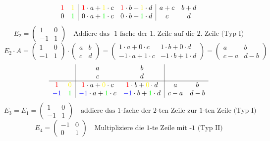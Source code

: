 \documentclass[9pt]{article} %
\begin{document}
\begin{bsp}
{\[\begin{array}{cc|cc|cc}
  \textcolor{red}{1} & \textcolor{yellow}{1} &  \textcolor{red}{1} \cdot a + \textcolor{yellow}{1}  \cdot c & \textcolor{red}{1} \cdot b + \textcolor{yellow}{1} \cdot d  & a+c & b+d \\
  0 & \textcolor{green}{1} & 0 \cdot a + \textcolor{green}{1}  \cdot c & 0 \cdot b + \textcolor{green}{1} \cdot d  & c & d 
\end{array}
\]
\hrulefill
\[
E_2 = \begin{pmatrix}
        1 & 0\\
        -1 & 1
\end{pmatrix} \quad \text{Addiere das -1-fache der 1. Zeile auf die 2. Zeile (Typ I)}
\]
\[
E_2 \cdot A = \begin{pmatrix} 
1 & 0\\
-1 & 1
\end{pmatrix} 
\cdot 
\begin{pmatrix} 
a & b \\
c & d 
\end{pmatrix} 
=
\begin{pmatrix} 
1 \cdot a + 0 \cdot c & 1 \cdot b + 0 \cdot d \\
-1 \cdot a + 1 \cdot c & -1 \cdot b + 1 \cdot d 
\end{pmatrix}
=
\begin{pmatrix} 
a  & b \\
c-a & d-b
\end{pmatrix}
\]
\[
\begin{array}{cc|cc|cc}
  &  & a&b  \\ 
  & &  c & d   \\ \hline
  \textcolor{red}{1} & \textcolor{yellow}{0} &  \textcolor{red}{1} \cdot a + \textcolor{yellow}{0}  \cdot c & \textcolor{red}{1} \cdot b + \textcolor{yellow}{0} \cdot d  & a & b \\
  \textcolor{blue}{-1} & \textcolor{green}{1} &  \textcolor{blue}{-1} \cdot a + \textcolor{green}{1}  \cdot c &  \textcolor{blue}{-1} \cdot b + \textcolor{green}{1} \cdot d  & c-a & d-b
\end{array}
\]
\hrulefill
\[
E_3 = E_1 = \begin{pmatrix}
        1 & 0\\
        -1 & 1
\end{pmatrix} \quad \text{addiere das 1-fache der 2-ten Zeile zur 1-ten Zeile (Typ I)}
\]
\hrulefill
\[
E_4 = \begin{pmatrix}
        -1 & 0\\
        0 & 1
\end{pmatrix} \quad \text{Multipliziere die 1-te Zeile mit -1 (Typ II)}
\]}
\end{bsp}
\end{document}
